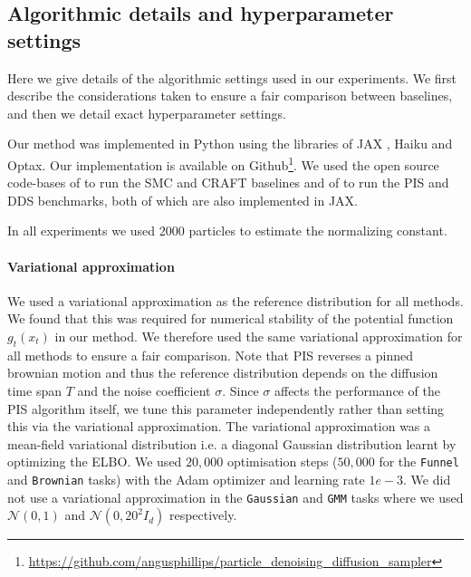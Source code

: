\documentclass{article}
\theoremstyle{plain}
\theoremstyle{definition}
\theoremstyle{remark}
\begin{document}
\subsection{Algorithmic details and hyperparameter settings}
\label{apx:exp_settings}

Here we give details of the algorithmic settings used in our experiments. We first describe the considerations taken to ensure a fair comparison between baselines, and then we detail exact hyperparameter settings.

Our method was implemented in Python using the libraries of JAX \cite{Bradbury:2018}, Haiku and Optax. Our implementation is available on Github\footnote{\url{https://github.com/angusphillips/particle_denoising_diffusion_sampler}}. We used the open source code-bases of \citet{arbel2021annealed} to run the SMC and CRAFT baselines and of \citet{vargasDDSampler2023} to run the PIS and DDS benchmarks, both of which are also implemented in JAX.

In all experiments we used $2000$ particles to estimate the normalizing constant.

\paragraph{Variational approximation} We used a variational approximation as the reference distribution for all methods. We found that this was required for numerical stability of the potential function $g_t(x_t)$ in our method. We therefore used the same variational approximation for all methods to ensure a fair comparison. Note that PIS reverses a pinned brownian motion and thus the reference distribution depends on the diffusion time span $T$ and the noise coefficient $\sigma$. Since $\sigma$ affects the performance of the PIS algorithm itself, we tune this parameter independently rather than setting this via the variational approximation. The variational approximation was a mean-field variational distribution i.e. a diagonal Gaussian distribution learnt by optimizing the ELBO. We used $20,000$ optimisation steps ($50,000$ for the \verb|Funnel| and \verb|Brownian| tasks) with the Adam optimizer \cite{adam} and learning rate $1e-3$. We did not use a variational approximation in the \verb|Gaussian| and \verb|GMM| tasks where we used $\mathcal{N}(0, 1)$ and $\mathcal{N}(0, 20^2 I_d)$ respectively.
\end{document}
